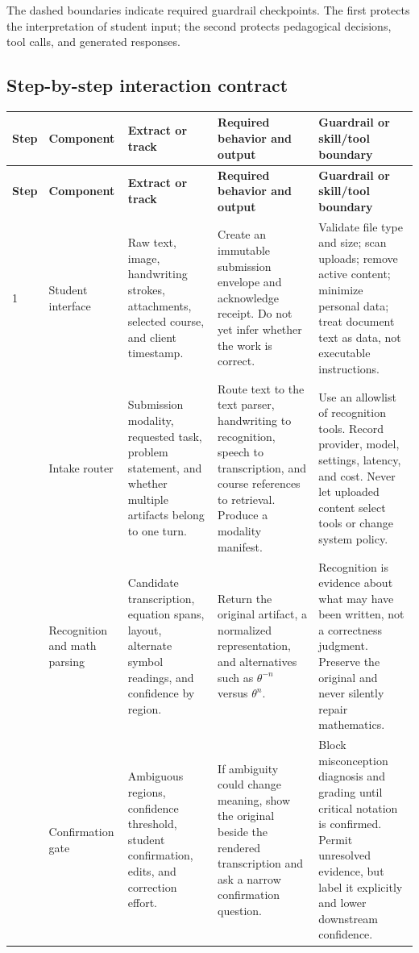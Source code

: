 \documentclass[11pt]{article}
\begin{document}
The dashed boundaries indicate required guardrail checkpoints. The first protects the interpretation of student input; the second protects pedagogical decisions, tool calls, and generated responses.

\subsection{Step-by-step interaction contract}

\small
\begin{longtable}{@{}p{}p{}p{}p{}p{}@{}}
\toprule
\textbf{Step} & \textbf{Component} & \textbf{Extract or track} & \textbf{Required behavior and output} & \textbf{Guardrail or skill/tool boundary} \\
\midrule
\endfirsthead
\toprule
\textbf{Step} & \textbf{Component} & \textbf{Extract or track} & \textbf{Required behavior and output} & \textbf{Guardrail or skill/tool boundary} \\
\midrule
\endhead
1 & Student interface & Raw text, image, handwriting strokes, attachments, selected course, and client timestamp. & Create an immutable submission envelope and acknowledge receipt. Do not yet infer whether the work is correct. & Validate file type and size; scan uploads; remove active content; minimize personal data; treat document text as data, not executable instructions. \\
\addlinespace
2 & Intake router & Submission modality, requested task, problem statement, and whether multiple artifacts belong to one turn. & Route text to the text parser, handwriting to recognition, speech to transcription, and course references to retrieval. Produce a modality manifest. & Use an allowlist of recognition tools. Record provider, model, settings, latency, and cost. Never let uploaded content select tools or change system policy. \\
\addlinespace
3 & Recognition and math parsing & Candidate transcription, equation spans, layout, alternate symbol readings, and confidence by region. & Return the original artifact, a normalized representation, and alternatives such as $\theta^{-n}$ versus $\theta^n$. & Recognition is evidence about what may have been written, not a correctness judgment. Preserve the original and never silently repair mathematics. \\
\addlinespace
4 & Confirmation gate & Ambiguous regions, confidence threshold, student confirmation, edits, and correction effort. & If ambiguity could change meaning, show the original beside the rendered transcription and ask a narrow confirmation question. & Block misconception diagnosis and grading until critical notation is confirmed. Permit unresolved evidence, but label it explicitly and lower downstream confidence. \\

\end{longtable}
\end{document}
